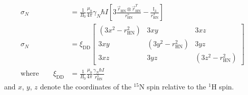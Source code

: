 \documentclass[a4paper,10pt,english,openany,oneside]{sphinxmanual}
\begin{document}
\begin{equation*}
\begin{split}\sigma_N &= \frac{1}{B_0}\frac{\mu_0}{4\pi}\gamma_N\hbar I \left[ 3\frac{\vec r_\text{HN}\otimes \vec r_\text{HN}^T}{r_\text{HN}^5} - \frac{\mathbb{I}_3}{r_\text{HN}^3} \right]\\
\sigma_N &= \xi_\text{DD}
\begin{bmatrix}
(3x^2-r_\text{HN}^2) & 3xy & 3xz\\
3xy & (3y^2-r_\text{HN}^2) & 3yz\\
3xz & 3yz & (3z^2 - r_\text{HN}^2)
\end{bmatrix}\\
\text{where} \qquad \xi_\text{DD} &= \frac{1}{B_0} \frac{\mu_0}{4\pi} \frac{\gamma_N\hbar I}{r_\text{HN}^5}\end{split}
\end{equation*}
and \(x\), \(y\), \(z\) denote the coordinates of the $^{\text{15}}$N spin relative to the $^{\text{1}}$H spin.
\end{document}
